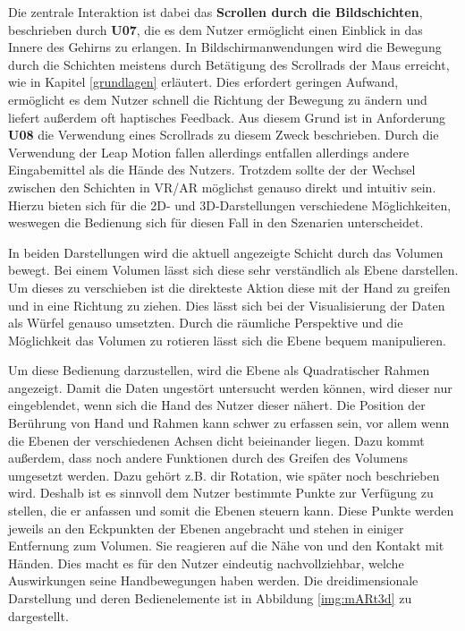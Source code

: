 Die zentrale Interaktion ist dabei das \textbf{Scrollen durch die Bildschichten}, beschrieben durch \textbf{U07}, die es dem Nutzer ermöglicht einen Einblick in das Innere des Gehirns zu erlangen. In Bildschirmanwendungen wird die Bewegung durch die Schichten meistens durch Betätigung des Scrollrads der Maus erreicht, wie in Kapitel \ref{grundlagen} erläutert.
Dies erfordert geringen Aufwand, ermöglicht es dem Nutzer schnell die Richtung der Bewegung zu ändern und liefert außerdem oft haptisches Feedback. 
Aus diesem Grund ist in Anforderung \textbf{U08} die Verwendung eines Scrollrads zu diesem Zweck beschrieben. Durch die Verwendung der Leap Motion fallen allerdings entfallen allerdings andere Eingabemittel als die Hände des Nutzers.
Trotzdem sollte der der Wechsel zwischen den Schichten in VR/AR möglichst genauso direkt und intuitiv sein. 
Hierzu bieten sich für die 2D- und 3D-Darstellungen verschiedene Möglichkeiten, weswegen die Bedienung sich für diesen Fall in den Szenarien unterscheidet. 

In beiden Darstellungen wird die aktuell angezeigte Schicht durch das Volumen bewegt. Bei einem Volumen lässt sich diese sehr verständlich als Ebene darstellen. Um dieses zu verschieben ist die direkteste Aktion diese mit der Hand zu greifen und in eine Richtung zu ziehen. 
Dies lässt sich bei der Visualisierung der Daten als Würfel genauso umsetzten. Durch die räumliche Perspektive und die Möglichkeit das Volumen zu rotieren lässt sich die Ebene bequem manipulieren. 

Um diese Bedienung darzustellen, wird die Ebene als Quadratischer Rahmen angezeigt. Damit die Daten ungestört untersucht werden können, wird dieser nur eingeblendet, wenn sich die Hand des Nutzer dieser nähert. 
Die Position der Berührung von Hand und Rahmen kann schwer zu erfassen sein, vor allem wenn die Ebenen der verschiedenen Achsen dicht beieinander liegen. Dazu kommt außerdem, dass noch andere Funktionen durch des Greifen des Volumens umgesetzt werden. Dazu gehört z.B. dir Rotation, wie später noch beschrieben wird. Deshalb ist es sinnvoll dem Nutzer bestimmte Punkte zur Verfügung zu stellen, die er anfassen und somit die Ebenen steuern kann. Diese Punkte werden jeweils an den Eckpunkten der Ebenen angebracht und stehen in einiger Entfernung zum Volumen. Sie reagieren auf die Nähe von und den Kontakt mit Händen. Dies macht es für den Nutzer eindeutig nachvollziehbar, welche Auswirkungen seine Handbewegungen haben werden. 
Die dreidimensionale Darstellung und deren Bedienelemente ist in Abbildung \ref{img:mARt3d} zu dargestellt.

